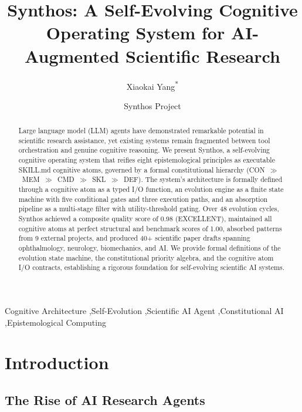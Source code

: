 \documentclass[review]{elsarticle}
\begin{document}
\begin{frontmatter}

\title{Synthos: A Self-Evolving Cognitive Operating System for AI-Augmented Scientific Research}

\author[1]{Xiaokai Yang\textsuperscript{*}}
\author[2]{Synthos Project}
\address[1]{Department of Neurology, Wenzhou People's Hospital, Wenzhou 325000, China}
\address[2]{GitHub: \url{https://github.com/yakeworld/Synthos}}

\begin{abstract}
Large language model (LLM) agents have demonstrated remarkable potential in scientific research assistance, yet existing systems remain fragmented between tool orchestration and genuine cognitive reasoning. We present Synthos, a self-evolving cognitive operating system that reifies eight epistemological principles as executable SKILL.md cognitive atoms, governed by a formal constitutional hierarchy (CON~$\gg$~MEM~$\gg$~CMD~$\gg$~SKL~$\gg$~DEF). The system's architecture is formally defined through a cognitive atom as a typed I/O function, an evolution engine as a finite state machine with five conditional gates and three execution paths, and an absorption pipeline as a multi-stage filter with utility-threshold gating. Over 48 evolution cycles, Synthos achieved a composite quality score of 0.98 (EXCELLENT), maintained all cognitive atoms at perfect structural and benchmark scores of 1.00, absorbed patterns from 9 external projects, and produced 40+ scientific paper drafts spanning ophthalmology, neurology, biomechanics, and AI. We provide formal definitions of the evolution state machine, the constitutional priority algebra, and the cognitive atom I/O contracts, establishing a rigorous foundation for self-evolving scientific AI systems.
\end{abstract}

\begin{keyword}
Cognitive Architecture \sep Self-Evolution \sep Scientific AI Agent \sep Constitutional AI \sep Epistemological Computing
\end{keyword}
\end{frontmatter}

\section{Introduction}
\label{sec:introduction}

\subsection{The Rise of AI Research Agents}
\label{sec:rise}
\end{document}

